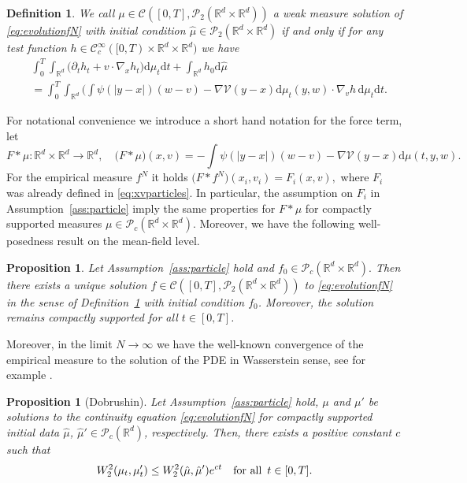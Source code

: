 \documentclass[11pt]{article}
\newtheorem{definition}[theorem]{Definition}
\newtheorem{proposition}[theorem]{Proposition}
\newcommand{\R}[0]{\mathbb R}
\newcommand{\calC}[0]{\mathcal C}
\newcommand{\calP}[0]{\mathcal P}
\newcommand{\dd}[0]{\mathrm d}
\newcommand{\V}[0]{\mathcal V}
\begin{document}
\begin{bibunit}[abbrv]
\begin{definition}\label{def:weaksolution}
	We call $\mu\in \calC([0,T],\calP_2(\R^d\times \R^d))$ a {\em weak measure solution} of \eqref{eq:evolutionfN} with initial condition $\hat \mu \in \calP_2(\R^d\times \R^d)$ if and only if  for any test function $h\in \mathcal{C}_c^\infty([0, T)\times \R^d\times \R^d)$ we have
	\begin{align*}
	&\int_0^T \int_{\R^d} \big( \partial_t h_t  + v\cdot\nabla_x h_t \big)\dd \mu_t\dd t + \int_{\R^d} h_0\dd \hat \mu \\
	&= \int_0^T \int_{\R^d} \Big( \int \psi(| y -  x |)(w - v) - \nabla \V(y - x) \dd \mu_t(y,w) \cdot \nabla_v h\, \dd \mu_t\dd t.
	\end{align*}
\end{definition}
For notational convenience we introduce a short hand notation for the force term, let 
$$ F\ast\mu \colon \R^d \times \R^d \rightarrow \R^d, \quad \big(F\ast\mu\big)(x,v) = -\int \psi(| y -  x |)(w - v) - \nabla \V(y - x) \dd \mu(t,y,w). $$
For the empirical measure $f^N$ it holds 
$\big(F\ast f^N)(x_i,v_i) = F_i(x,v),$ where $F_i$ was already defined in \eqref{eq:xvparticles}. In particular, the assumption on $F_i$ in Assumption~\ref{ass:particle} imply the same properties for $F\ast\mu$ for compactly supported measures  $\mu \in \calP_c(\R^d\times\R^d).$ Moreover, we have the following well-posedness result on the mean-field level.

\begin{proposition}\label{prop:WellPDE}\cite{canizo2011well}
Let Assumption~\ref{ass:particle} hold and $f_0 \in \calP_c(\R^d\times\R^d).$ Then there exists a unique solution $f\in\calC([0,T],\calP_2(\R^d \times \R^d))$ to \eqref{eq:evolutionfN} in the sense of Definition~\ref{def:weaksolution} with initial condition $f_0$. Moreover, the solution remains compactly supported for all $t\in[0,T]$.
\end{proposition}

Moreover, in the limit $N\rightarrow\infty$ we have the well-known convergence of the empirical measure to the solution of the PDE in Wasserstein sense, see for example \cite{golse2016dynamics}.
\begin{proposition}[Dobrushin]\label{prop:Dobrushin}
     Let Assumption~\ref{ass:particle} hold, $\mu$ and $\mu'$ be solutions to the continuity equation \eqref{eq:evolutionfN} for compactly supported initial data $\hat \mu$, $\hat\mu' \in\calP_c(\R^d)$, respectively. Then, there exists a positive constant $c$ such that
 \begin{equation*}
 W_2^2(\mu_t,\mu_t') \le W_2^2(\hat \mu,\hat \mu') e^{c t}\quad \text{for all\, $t\in[0,T]$}.
 \end{equation*}
\end{proposition}


\end{bibunit}
\end{document}
